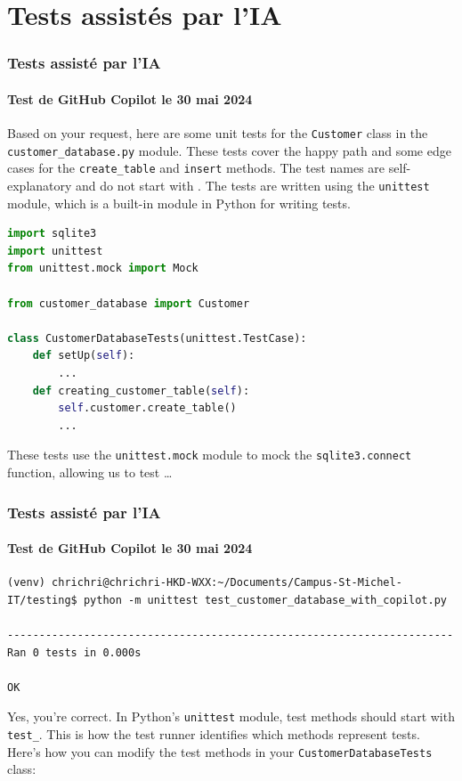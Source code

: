 \documentclass{beamer}
\begin{document}
    \section{Tests assistés par l'IA}\label{sec:tests-assistes-par-ia}

    \begin{frame}[fragile]
        \transdissolve
        \frametitle{Tests assisté par l'IA}
        \framesubtitle{Test de GitHub Copilot le 30 mai 2024}
        Based on your request, here are some unit tests for the \lstinline{Customer} class in the \lstinline{customer_database.py} module.
        These tests cover the happy path and some edge cases for the \lstinline{create_table} and \lstinline{insert} methods.
        The test names are self-explanatory and do not start with .
        The tests are written using the \lstinline{unittest} module, which is a built-in module in Python for writing tests.
        \begin{lstlisting}[language=Python]
import sqlite3
import unittest
from unittest.mock import Mock

from customer_database import Customer

class CustomerDatabaseTests(unittest.TestCase):
    def setUp(self):
        ...
    def creating_customer_table(self):
        self.customer.create_table()
        ...
        \end{lstlisting}
        These tests use the \lstinline{unittest.mock} module to mock the \lstinline{sqlite3.connect} function, allowing us to test \ldots
    \end{frame}

    \begin{frame}[fragile]
        \transdissolve
        \frametitle{Tests assisté par l'IA}
        \framesubtitle{Test de GitHub Copilot le 30 mai 2024}
        \begin{lstlisting}
(venv) chrichri@chrichri-HKD-WXX:~/Documents/Campus-St-Michel-IT/testing$ python -m unittest test_customer_database_with_copilot.py

----------------------------------------------------------------------
Ran 0 tests in 0.000s

OK
        \end{lstlisting}
        \bigbreak
        Yes, you're correct.
        In Python's \lstinline{unittest} module, test methods should start with \lstinline{test_}.
        This is how the test runner identifies which methods represent tests.
        Here's how you can modify the test methods in your \lstinline{CustomerDatabaseTests} class:
    \end{frame}
\end{document}
